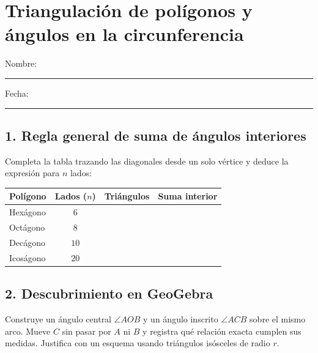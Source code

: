 \documentclass[spanish,letterpaper,oneside]{article}
\begin{document}
\templatePortrait\templatePagecfg\templateFinalcfg\fancyfoot{}\fancyfoot[C]{\scriptsize\thepage}\raggedbottom

\section*{Triangulación de polígonos y ángulos en la circunferencia}
Nombre: \rule{8cm}{.2pt}\hfill Fecha: \rule{2.5cm}{.2pt}

\subsection*{1. Regla general de suma de ángulos interiores}
Completa la tabla trazando las diagonales desde un solo vértice y deduce la expresión para $n$ lados:

\begin{center}
\begin{tabular}{|l|c|c|c|}\hline
\textbf{Polígono} & \textbf{Lados ($n$)} & \textbf{Triángulos} & \textbf{Suma interior} \\\hline
Hexágono & $6$ & & \\[0.45cm]\hline
Octágono & $8$ & & \\[0.45cm]\hline
Decágono & $10$ & & \\[0.45cm]\hline
Icoságono & $20$ & & \\[0.45cm]\hline
\end{tabular}
\end{center}

\subsection*{2. Descubrimiento en GeoGebra}
Construye un ángulo central $\angle AOB$ y un ángulo inscrito $\angle ACB$ sobre el mismo arco. Mueve $C$ sin pasar por $A$ ni $B$ y registra qué relación exacta cumplen sus medidas. Justifica con un esquema usando triángulos isósceles de radio $r$.
\vspace{2.2cm}
\end{document}
